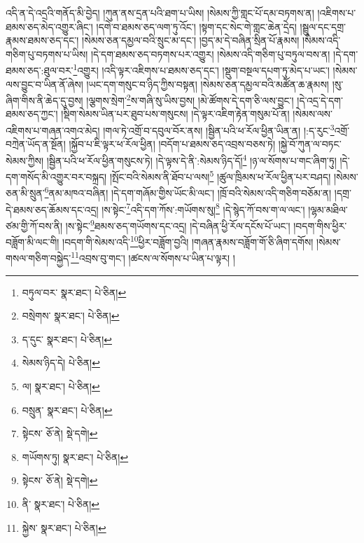 འདི་ན་དེ་འདྲའི་གནོད་མི་བྱེད། །ཀུན་ནས་དྲན་པའི་ཐག་པ་ཡིས། །སེམས་ཀྱི་གླང་པོ་དམ་བཏགས་ན། །འཇིགས་པ་ཐམས་ཅད་མེད་འགྱུར་ཞིང་། །དགེ་བ་ཐམས་ཅད་ལག་ཏུ་འོང་། །སྟག་དང་སེང་གེ་གླང་ཆེན་དྲེད། །སྦྲུལ་དང་དགྲ་རྣམས་ཐམས་ཅད་དང་། །སེམས་ཅན་དམྱལ་བའི་སྲུང་མ་དང་། །བྱད་མ་དེ་བཞིན་སྲིན་པོ་རྣམས། །སེམས་འདི་གཅིག་པུ་བཏགས་པ་ཡིས། །དེ་དག་ཐམས་ཅད་བཏགས་པར་འགྱུར། །སེམས་འདི་གཅིག་པུ་བཏུལ་བས་ན། །དེ་དག་ཐམས་ཅད་:ཐུལ་བར་\footnote{བཏུལ་བར་  སྣར་ཐང་།  པེ་ཅིན། }འགྱུར། །འདི་ལྟར་འཇིགས་པ་ཐམས་ཅད་དང་། །སྡུག་བསྔལ་དཔག་ཏུ་མེད་པ་ཡང་། །སེམས་ལས་བྱུང་བ་ཡིན་ནོ་ཞེས། །ཡང་དག་གསུང་བ་ཉིད་ཀྱིས་བསྟན། །སེམས་ཅན་དམྱལ་བའི་མཚོན་ཆ་རྣམས། །སུ་ཞིག་གིས་ནི་ཆེད་དུ་བྱས། །ལྕགས་སྲེག་\footnote{བསྲེགས་  སྣར་ཐང་།  པེ་ཅིན། }ས་གཞི་སུ་ཡིས་བྱས། །མེ་ཚོགས་དེ་དག་ཅི་ལས་བྱུང་། །དེ་འདྲ་དེ་དག་ཐམས་ཅད་ཀྱང་། །སྡིག་སེམས་ཡིན་པར་ཐུབ་པས་གསུངས། །དེ་ལྟར་འཇིག་རྟེན་གསུམ་པོ་ན། །སེམས་ལས་འཇིགས་པ་གཞན་འགའ་མེད། །གལ་ཏེ་འགྲོ་བ་དབུལ་བོར་ནས། །སྦྱིན་པའི་ཕ་རོལ་ཕྱིན་ཡིན་ན། །:ད་རུང་\footnote{ད་དུང་  སྣར་ཐང་།  པེ་ཅིན། }འགྲོ་བཀྲེན་ཡོད་ན་སྔོན། །སྐྱོབ་པ་ཇི་ལྟར་ཕ་རོལ་ཕྱིན། །བདོག་པ་ཐམས་ཅད་འབྲས་བཅས་ཏེ། །སྐྱེ་བོ་ཀུན་ལ་བཏང་སེམས་ཀྱིས། །སྦྱིན་པའི་ཕ་རོལ་ཕྱིན་གསུངས་ཏེ། །དེ་ལྟས་དེ་ནི་:སེམས་ཉིད་དོ།\footnote{སེམས་ཉིད་དེ།  པེ་ཅིན། } །ཉ་ལ་སོགས་པ་གང་ཞིག་ཏུ། །དེ་དག་གསོད་མི་འགྱུར་བར་བསྐྲད། །སྤོང་བའི་སེམས་ནི་ཐོབ་པ་ལས།\footnote{ལ།  སྣར་ཐང་།  པེ་ཅིན། } །ཚུལ་ཁྲིམས་ཕ་རོལ་ཕྱིན་པར་བཤད། །སེམས་ཅན་མི་སྲུན་\footnote{བསྲུན་  སྣར་ཐང་།  པེ་ཅིན། }ནམ་མཁའ་བཞིན། །དེ་དག་གཞོམ་གྱིས་ཡོང་མི་ལང་། །ཁྲོ་བའི་སེམས་འདི་གཅིག་བཅོམ་ན། །དགྲ་དེ་ཐམས་ཅད་ཆོམས་དང་འདྲ། །ས་སྟེང་\footnote{སྟེངས་  ཅོ་ནེ།  སྡེ་དགེ། }འདི་དག་ཀོས་:གཡོགས་སུ།\footnote{གཡོགས་ཏུ།  སྣར་ཐང་།  པེ་ཅིན། } །དེ་སྙེད་ཀོ་བས་ག་ལ་ལང་། །ལྷམ་མཐིལ་ཙམ་གྱི་ཀོ་བས་ནི། །ས་སྟེང་\footnote{སྟེངས་  ཅོ་ནེ།  སྡེ་དགེ། }ཐམས་ཅད་གཡོགས་དང་འདྲ། །དེ་བཞིན་ཕྱི་རོལ་དངོས་པོ་ཡང་། །བདག་གིས་ཕྱིར་བཟློག་མི་ལང་གི། །བདག་གི་སེམས་འདི་\footnote{ནི་  སྣར་ཐང་།  པེ་ཅིན། }ཕྱིར་བཟློག་བྱའི། །གཞན་རྣམས་བཟློག་གོ་ཅི་ཞིག་དགོས། །སེམས་གསལ་གཅིག་བསྐྱེད་\footnote{སྐྱེས་  སྣར་ཐང་།  པེ་ཅིན། }འབྲས་བུ་གང་། །ཚངས་ལ་སོགས་པ་ཡིན་པ་ལྟར། །
